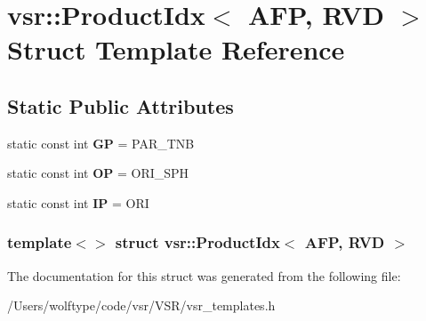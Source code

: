 \hypertarget{structvsr_1_1_product_idx_3_01_a_f_p_00_01_r_v_d_01_4}{\section{vsr\-:\-:Product\-Idx$<$ A\-F\-P, R\-V\-D $>$ Struct Template Reference}
\label{structvsr_1_1_product_idx_3_01_a_f_p_00_01_r_v_d_01_4}
}
\subsection*{Static Public Attributes}
\begin{DoxyCompactItemize}
\item 
\hypertarget{structvsr_1_1_product_idx_3_01_a_f_p_00_01_r_v_d_01_4_a7d1e750ef2a9d5889c39e8106b73aa11}{static const int {\bfseries G\-P} = P\-A\-R\-\_\-\-T\-N\-B}\label{structvsr_1_1_product_idx_3_01_a_f_p_00_01_r_v_d_01_4_a7d1e750ef2a9d5889c39e8106b73aa11}

\item 
\hypertarget{structvsr_1_1_product_idx_3_01_a_f_p_00_01_r_v_d_01_4_ae0801d60f69e477ce46aae87bdd53f2e}{static const int {\bfseries O\-P} = O\-R\-I\-\_\-\-S\-P\-H}\label{structvsr_1_1_product_idx_3_01_a_f_p_00_01_r_v_d_01_4_ae0801d60f69e477ce46aae87bdd53f2e}

\item 
\hypertarget{structvsr_1_1_product_idx_3_01_a_f_p_00_01_r_v_d_01_4_ae8eaaa8c865c3b213b9120bb4d651120}{static const int {\bfseries I\-P} = O\-R\-I}\label{structvsr_1_1_product_idx_3_01_a_f_p_00_01_r_v_d_01_4_ae8eaaa8c865c3b213b9120bb4d651120}

\end{DoxyCompactItemize}
\subsubsection*{template$<$$>$ struct vsr\-::\-Product\-Idx$<$ A\-F\-P, R\-V\-D $>$}



The documentation for this struct was generated from the following file\-:\begin{DoxyCompactItemize}
\item 
/\-Users/wolftype/code/vsr/\-V\-S\-R/vsr\-\_\-templates.\-h\end{DoxyCompactItemize}
